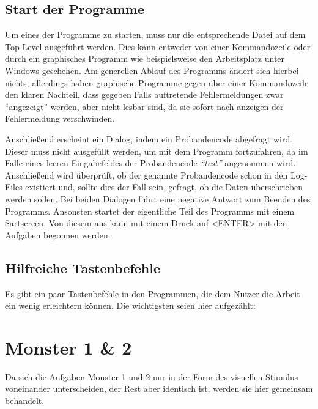 \documentclass[a4paper]{scrartcl}
\newtheorem[M]{thmL}{Definition}
\begin{document}
\subsection{Start der Programme} \label{start}
Um eines der Programme zu starten, muss nur die entsprechende Datei auf dem Top-Level ausgeführt werden. Dies kann entweder von einer Kommandozeile oder durch ein graphisches Programm wie beispielsweise den Arbeitsplatz unter Windows geschehen. Am generellen Ablauf des Programms ändert sich hierbei nichts, allerdings haben graphische Programme gegen über einer Kommandozeile den klaren Nachteil, dass gegeben Falls auftretende Fehlermeldungen zwar "`angezeigt"' werden, aber nicht lesbar sind, da sie sofort nach anzeigen der Fehlermeldung verschwinden.

Anschließend erscheint ein Dialog, indem ein Probandencode abgefragt wird. Dieser muss nicht ausgefüllt werden, um mit dem Programm fortzufahren, da im Falle eines leeren Eingabefeldes der Probandencode \emph{"`test"'} angenommen wird. Anschließend wird überprüft, ob der genannte Probandencode schon in den Log-Files existiert und, sollte dies der Fall sein, gefragt, ob die Daten überschrieben werden sollen. Bei beiden Dialogen führt eine negative Antwort zum Beenden des Programms. Ansonsten startet der eigentliche Teil des Programms mit einem Sartscreen. Von diesem aus kann mit einem Druck auf <ENTER> mit den Aufgaben begonnen werden.

\subsection{Hilfreiche Tastenbefehle}
Es gibt ein paar Tastenbefehle in den Programmen, die dem Nutzer die Arbeit ein wenig erleichtern können. Die wichtigsten seien hier aufgezählt:

\section{Monster 1 \& 2}
Da sich die Aufgaben Monster 1 und 2 nur in der Form des visuellen Stimulus voneinander unterscheiden, der Rest aber identisch ist, werden sie hier gemeinsam behandelt.
\end{document}

